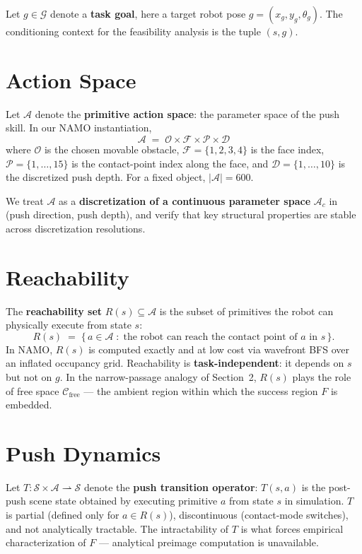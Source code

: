 \documentclass[11pt]{article}
\begin{document}
Let $g \in \mathcal{G}$ denote a \textbf{task goal}, here a target robot pose
$g = (x_g, y_g, \theta_g)$. The conditioning context for the feasibility
analysis is the tuple $(s, g)$.

\section{Action Space}

Let $\mathcal{A}$ denote the \textbf{primitive action space}: the parameter
space of the push skill. In our NAMO instantiation,
\[
  \mathcal{A} \;=\; \mathcal{O} \times \mathcal{F} \times \mathcal{P} \times \mathcal{D}
\]
where $\mathcal{O}$ is the chosen movable obstacle,
$\mathcal{F} = \{1,2,3,4\}$ is the face index,
$\mathcal{P} = \{1, \dots, 15\}$ is the contact-point index along the face,
and $\mathcal{D} = \{1, \dots, 10\}$ is the discretized push depth. For a
fixed object, $|\mathcal{A}| = 600$.

We treat $\mathcal{A}$ as a \textbf{discretization of a continuous parameter
space} $\mathcal{A}_c$ in (push direction, push depth), and verify that key
structural properties are stable across discretization resolutions.

\section{Reachability}

The \textbf{reachability set} $R(s) \subseteq \mathcal{A}$ is the subset of
primitives the robot can physically execute from state $s$:
\[
  R(s) \;=\; \{\,a \in \mathcal{A} \;:\;
    \text{the robot can reach the contact point of $a$ in $s$}\,\}.
\]
In NAMO, $R(s)$ is computed exactly and at low cost via wavefront BFS over an
inflated occupancy grid. Reachability is \textbf{task-independent}: it depends
on $s$ but not on $g$. In the narrow-passage analogy of Section~2, $R(s)$
plays the role of free space $\mathcal{C}_{\text{free}}$ --- the ambient
region within which the success region $F$ is embedded.

\section{Push Dynamics}

Let $T : \mathcal{S} \times \mathcal{A} \rightharpoonup \mathcal{S}$ denote
the \textbf{push transition operator}: $T(s, a)$ is the post-push scene state
obtained by executing primitive $a$ from state $s$ in simulation. $T$ is
partial (defined only for $a \in R(s)$), discontinuous (contact-mode
switches), and not analytically tractable. The intractability of $T$ is what
forces empirical characterization of $F$ --- analytical preimage computation
is unavailable.
\end{document}
